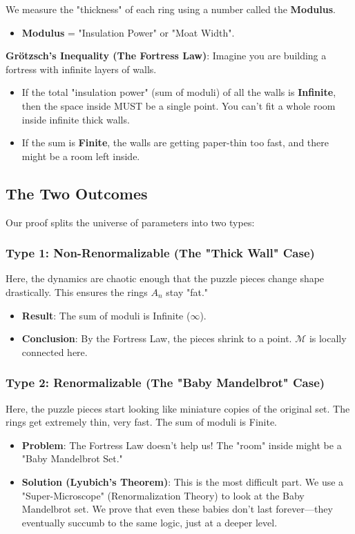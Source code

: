 We measure the "thickness" of each ring using a number called the \textbf{Modulus}.
\begin{itemize}
    \item \textbf{Modulus} = "Insulation Power" or "Moat Width".
\end{itemize}

\textbf{Grötzsch's Inequality (The Fortress Law)}:
Imagine you are building a fortress with infinite layers of walls.
\begin{itemize}
    \item If the total "insulation power" (sum of moduli) of all the walls is \textbf{Infinite}, then the space inside MUST be a single point. You can't fit a whole room inside infinite thick walls.
    \item If the sum is \textbf{Finite}, the walls are getting paper-thin too fast, and there might be a room left inside.
\end{itemize}

\subsection{The Two Outcomes}

Our proof splits the universe of parameters into two types:

\subsubsection{Type 1: Non-Renormalizable (The "Thick Wall" Case)}
Here, the dynamics are chaotic enough that the puzzle pieces change shape drastically. This ensures the rings $A_n$ stay "fat."
\begin{itemize}
    \item \textbf{Result}: The sum of moduli is Infinite ($\infty$).
    \item \textbf{Conclusion}: By the Fortress Law, the pieces shrink to a point. $\mathcal{M}$ is locally connected here.
\end{itemize}

\subsubsection{Type 2: Renormalizable (The "Baby Mandelbrot" Case)}
Here, the puzzle pieces start looking like miniature copies of the original set. The rings get extremely thin, very fast. The sum of moduli is Finite.
\begin{itemize}
    \item \textbf{Problem}: The Fortress Law doesn't help us! The "room" inside might be a "Baby Mandelbrot Set."
    \item \textbf{Solution (Lyubich's Theorem)}: This is the most difficult part. We use a "Super-Microscope" (Renormalization Theory) to look at the Baby Mandelbrot set. We prove that even these babies don't last forever—they eventually succumb to the same logic, just at a deeper level.
\end{itemize}

